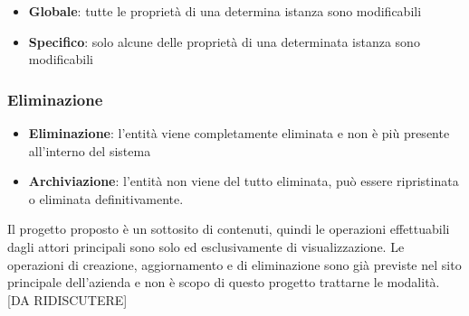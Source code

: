 \documentclass[12pt,italian,]{report}
\providecommand{\tightlist}{%
  \setlength{\itemsep}{0pt}\setlength{\parskip}{0pt}}
\begin{document}
\begin{itemize}
\tightlist
\item
  \textbf{Globale}: tutte le proprietà di una determina istanza sono
  modificabili
\item
  \textbf{Specifico}: solo alcune delle proprietà di una determinata
  istanza sono modificabili
\end{itemize}

\hypertarget{eliminazione}{%
\subsubsection{Eliminazione}\label{eliminazione}}

\begin{itemize}
\tightlist
\item
  \textbf{Eliminazione}: l'entità viene completamente eliminata e non è
  più presente all'interno del sistema
\item
  \textbf{Archiviazione}: l'entità non viene del tutto eliminata, può
  essere ripristinata o eliminata definitivamente.
\end{itemize}

Il progetto proposto è un sottosito di contenuti, quindi le operazioni
effettuabili dagli attori principali sono solo ed esclusivamente di
visualizzazione. Le operazioni di creazione, aggiornamento e di
eliminazione sono già previste nel sito principale dell'azienda e non è
scopo di questo progetto trattarne le modalità. {[}DA RIDISCUTERE{]}
\end{document}
